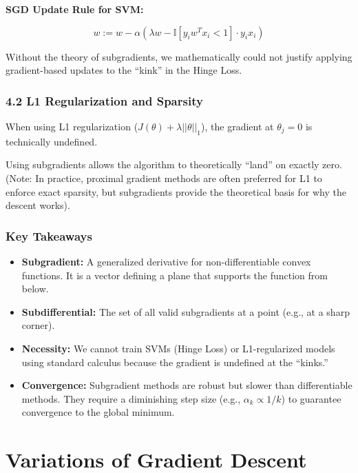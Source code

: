 \documentclass[
  italian,
  11pt,
]{article}
\begin{document}
\textbf{SGD Update Rule for SVM:}

\[w := w - \alpha \left( \lambda w - \mathbb{I}[y_i w^T x_i < 1] \cdot y_i x_i \right)\]

Without the theory of subgradients, we mathematically could not justify
applying gradient-based updates to the ``kink'' in the Hinge Loss.

\subsubsection{4.2 L1 Regularization and
Sparsity}\label{l1-regularization-and-sparsity}

When using L1 regularization (\(J(\theta) + \lambda ||\theta||_1\)), the
gradient at \(\theta_j = 0\) is technically undefined.

Using subgradients allows the algorithm to theoretically ``land'' on
exactly zero. (Note: In practice, proximal gradient methods are often
preferred for L1 to enforce exact sparsity, but subgradients provide the
theoretical basis for why the descent works).

\subsubsection{Key Takeaways}\label{key-takeaways-13}

\begin{itemize}
\item
  \textbf{Subgradient:} A generalized derivative for non-differentiable
  convex functions. It is a vector defining a plane that supports the
  function from below.
\item
  \textbf{Subdifferential:} The set of all valid subgradients at a point
  (e.g., at a sharp corner).
\item
  \textbf{Necessity:} We cannot train SVMs (Hinge Loss) or
  L1-regularized models using standard calculus because the gradient is
  undefined at the ``kinks.''
\item
  \textbf{Convergence:} Subgradient methods are robust but slower than
  differentiable methods. They require a diminishing step size (e.g.,
  \(\alpha_k \propto 1/k\)) to guarantee convergence to the global
  minimum.

  \newpage
\end{itemize}

\section{Variations of Gradient
Descent}\label{variations-of-gradient-descent-1}
\end{document}
